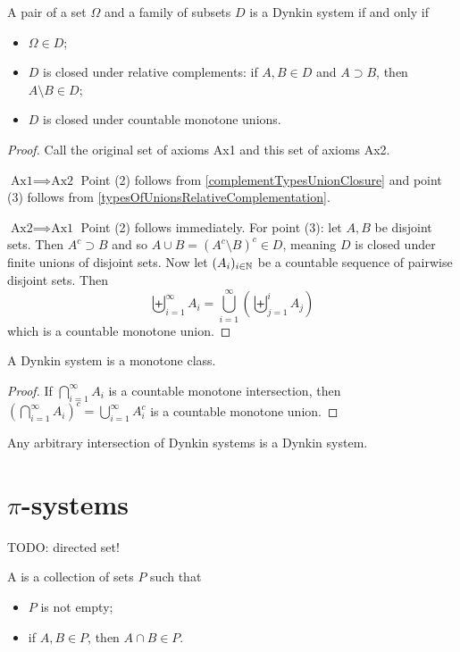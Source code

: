 \begin{lemma}
A pair of a set $\Omega$ and a family of subsets $D$ is a Dynkin system \textup{if and only if}
\begin{itemize}
\item $\Omega\in D$;
\item $D$ is closed under relative complements: if $A,B\in D$ and $A\supset B$, then $A\setminus B\in D$;
\item $D$ is closed under countable monotone unions.
\end{itemize}
\end{lemma}
\begin{proof}
Call the original set of axioms Ax1 and this set of axioms Ax2.

$\boxed{\text{Ax1}\implies\text{Ax2}}$ Point (2) follows from \ref{complementTypesUnionClosure} and point (3) follows from \ref{typesOfUnionsRelativeComplementation}.

$\boxed{\text{Ax2}\implies\text{Ax1}}$ Point (2) follows immediately. For point (3): let $A,B$ be disjoint sets. Then $A^c \supset B$ and so $A\cup B = (A^c\setminus B)^c \in D$, meaning $D$ is closed under finite unions of disjoint sets. Now let $(A_i)_{i\in\mathbb{N}}$ be a countable sequence of pairwise disjoint sets. Then
\[ \biguplus_{i=1}^\infty A_i = \bigcup_{i=1}^\infty \left(\biguplus_{j=1}^i A_j\right) \]
which is a countable monotone union.
\end{proof}

\begin{lemma}
A Dynkin system is a monotone class.
\end{lemma}
\begin{proof}
If $\bigcap_{i=1}^\infty A_i$ is a countable monotone intersection, then $\left(\bigcap_{i=1}^\infty A_i\right)^c = \bigcup_{i=1}^\infty A_i^c$ is a countable monotone union.
\end{proof}
\begin{lemma}
Any arbitrary intersection of Dynkin systems is a Dynkin system.
\end{lemma}

\section{$\pi$-systems}
TODO: directed set!
\begin{definition}
A  is a collection of sets $P$ such that
\begin{itemize}
\item $P$ is not empty;
\item if $A,B\in P$, then $A\cap B\in P$.
\end{itemize}
\end{definition}


